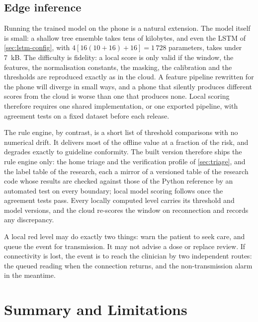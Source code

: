 \subsection{Edge inference}\label{sec:edge-inference}\label{sec:export-what}\label{sec:rule-export}\label{sec:version-stamp}\label{sec:local-alert}\label{sec:model-size}

Running the trained model on the phone is a natural extension. The model itself is small: a shallow tree ensemble takes tens of kilobytes, and even the LSTM of \cref{sec:lstm-config}, with $4[16(10+16)+16] = 1\,728$ parameters, takes under 7~kB. The difficulty is fidelity: a local score is only valid if the window, the features, the normalisation constants, the masking, the calibration and the thresholds are reproduced exactly as in the cloud. A feature pipeline rewritten for the phone will diverge in small ways, and a phone that silently produces different scores from the cloud is worse than one that produces none. Local scoring therefore requires one shared implementation, or one exported pipeline, with agreement tests on a fixed dataset before each release.

The rule engine, by contrast, is a short list of threshold comparisons with no numerical drift. It delivers most of the offline value at a fraction of the risk, and degrades exactly to guideline conformity. The built version therefore ships the rule engine only: the home triage and the verification profile of \cref{sec:triage}, and the label table of the research, each a mirror of a versioned table of the research code whose results are checked against those of the Python reference by an automated test on every boundary; local model scoring follows once the agreement tests pass. Every locally computed level carries its threshold and model versions, and the cloud re-scores the window on reconnection and records any discrepancy.

A local red level may do exactly two things: warn the patient to seek care, and queue the event for transmission. It may not advise a dose or replace review. If connectivity is lost, the event is to reach the clinician by two independent routes: the queued reading when the connection returns, and the non-transmission alarm in the meantime.


\section{Summary and Limitations}\label{sec:arch-summary}\label{sec:interface-limits}\label{sec:backend-limits}\label{sec:iot-limits}\label{sec:traceability}

